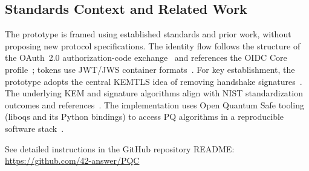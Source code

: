 \documentclass[conference]{IEEEtran}
\begin{document}
                \subsection{Standards Context and Related Work}
                The prototype is framed using established standards and prior work, without proposing new protocol specifications. The identity flow follows the structure of the OAuth~2.0 authorization-code exchange~\cite{rfc6749} and references the OIDC Core profile~\cite{oidc-core}; tokens use JWT/JWS container formats~\cite{rfc7519,rfc7515}. For key establishment, the prototype adopts the central KEMTLS idea of removing handshake signatures~\cite{kemtls}. The underlying KEM and signature algorithms align with NIST standardization outcomes and references~\cite{fips203,fips204,nist-pqc}. The implementation uses Open Quantum Safe tooling (liboqs and its Python bindings) to access PQ algorithms in a reproducible software stack~\cite{liboqs}.
                
                \noindent See detailed instructions in the GitHub repository README: \url{https://github.com/42-answer/PQC}
                
\end{document}
